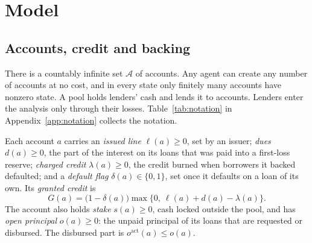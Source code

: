 \documentclass[acmsmall,nonacm,screen]{acmart}
\theoremstyle{acmdefinition}%
\newcommand{\A}{\mathcal{A}}
\newcommand{\act}{\mathrm{act}}
\begin{document}
\section{Model}\label{sec:model}

\subsection{Accounts, credit and backing}

There is a countably infinite set $\A$ of accounts. Any agent can create any number of accounts at
no cost, and in every state only finitely many accounts have nonzero state. A pool holds lenders'
cash and lends it to accounts. Lenders enter the analysis only through their losses. Table~\ref{tab:notation}
in Appendix~\ref{app:notation} collects the notation.

Each account $a$ carries an \emph{issued line} $\ell(a)\ge 0$, set by an issuer; \emph{dues}
$d(a)\ge0$, the part of the interest on its loans that was paid into a first-loss reserve;
\emph{charged credit} $\lambda(a)\ge 0$, the credit burned when borrowers it backed defaulted; and
a \emph{default flag} $\delta(a)\in\{0,1\}$, set once it defaults on a loan of its own. Its
\emph{granted credit} is
\begin{equation}\label{eq:granted}
  G(a) = \bigl(1-\delta(a)\bigr)\max\bigl\{0,\ \ell(a)+d(a)-\lambda(a)\bigr\}.
\end{equation}
The account also holds \emph{stake} $s(a)\ge 0$, cash locked outside the pool, and has \emph{open
principal} $o(a)\ge 0$: the unpaid principal of its loans that are requested or disbursed. The
disbursed part is $o^{\act}(a)\le o(a)$.
\end{document}
